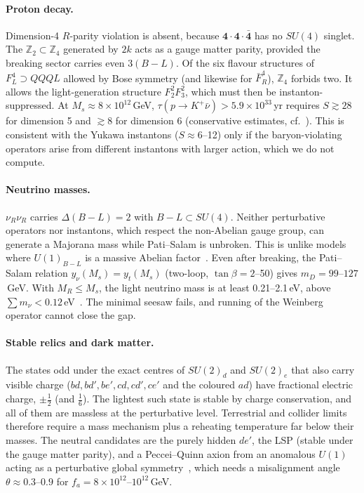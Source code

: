 \documentclass[aps,prd,twocolumn,superscriptaddress,nofootinbib,showkeys]{revtex4-2}
\begin{document}
\paragraph{Proton decay.} Dimension-4 $R$-parity violation is absent, because $\mathbf4\cdot\mathbf4\cdot\bar{\mathbf4}$ has no $SU(4)$ singlet. The $\mathbb Z_2\subset\mathbb Z_4$ generated by $2k$ acts as a gauge matter parity, provided the breaking sector carries even $3(B-L)$. Of the six flavour structures of $F_L^4\supset QQQL$ allowed by Bose symmetry (and likewise for $\bar F_R^4$), $\mathbb Z_4$ forbids two. It allows the light-generation structure $F_2^2F_3^2$, which must then be instanton-suppressed. At $M_s\approx8\times10^{12}$\,GeV, $\tau(p\to K^+\bar\nu)>5.9\times10^{33}$\,yr requires $S\gtrsim28$ for dimension 5 and $\gtrsim8$ for dimension 6 (conservative estimates, cf.~\cite{NFP}). This is consistent with the Yukawa instantons ($S\approx6$--12) only if the baryon-violating operators arise from different instantons with larger action, which we do not compute.

\paragraph{Neutrino masses.} $\nu_R\nu_R$ carries $\Delta(B-L)=2$ with $B-L\subset SU(4)$. Neither perturbative operators nor instantons, which respect the non-Abelian gauge group, can generate a Majorana mass while Pati--Salam is unbroken. This is unlike models where $U(1)_{B-L}$ is a massive Abelian factor~\cite{BCW}. Even after breaking, the Pati--Salam relation $y_\nu(M_s)=y_t(M_s)$ (two-loop, $\tan\beta=2$--50) gives $m_D=99$--$127$\,GeV. With $M_R\le M_s$, the light neutrino mass is at least 0.21--2.1\,eV, above $\sum m_\nu<0.12$\,eV~\cite{Planck}. The minimal seesaw fails, and running of the Weinberg operator cannot close the gap.

\paragraph{Stable relics and dark matter.} The states odd under the exact centres of $SU(2)_d$ and $SU(2)_e$ that also carry visible charge ($bd,bd',be',cd,cd',ce'$ and the coloured $ad$) have fractional electric charge, $\pm\tfrac12$ (and $\tfrac16$). The lightest such state is stable by charge conservation, and all of them are massless at the perturbative level. Terrestrial and collider limits~\cite{Perl} therefore require a mass mechanism plus a reheating temperature far below their masses. The neutral candidates are the purely hidden $de'$, the LSP (stable under the gauge matter parity), and a Peccei--Quinn axion from an anomalous $U(1)$ acting as a perturbative global symmetry~\cite{HSax}, which needs a misalignment angle $\theta\approx0.3$--$0.9$ for $f_a=8\times10^{12}$--$10^{12}$\,GeV.
\end{document}
